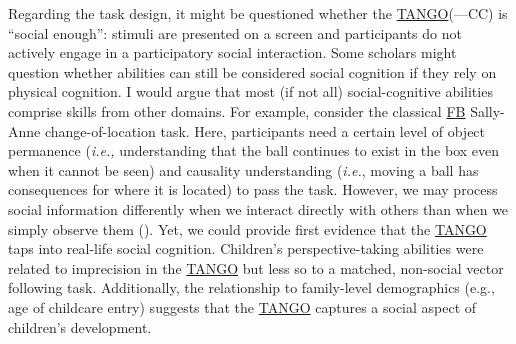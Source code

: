 \documentclass[
]{scrbook}
\begin{document}
Regarding the task design, it might be questioned whether the \hyperref[acronyms_TANGO]{TANGO}(---CC) is ``social enough'': stimuli are presented on a screen and participants do not actively engage in a participatory social interaction. Some scholars might question whether abilities can still be considered social cognition if they rely on physical cognition. I would argue that most (if not all) social-cognitive abilities comprise skills from other domains. For example, consider the classical \hyperref[acronyms_FB]{FB} Sally-Anne change-of-location task. Here, participants need a certain level of object permanence (\emph{i.e.,} understanding that the ball continues to exist in the box even when it cannot be seen) and causality understanding (\emph{i.e.}, moving a ball has consequences for where it is located) to pass the task. However, we may process social information differently when we interact directly with others than when we simply observe them (). Yet, we could provide first evidence that the \hyperref[acronyms_TANGO]{TANGO} taps into real-life social cognition. Children's perspective-taking abilities were related to imprecision in the \hyperref[acronyms_TANGO]{TANGO} but less so to a matched, non-social vector following task. Additionally, the relationship to family-level demographics (e.g., age of childcare entry) suggests that the \hyperref[acronyms_TANGO]{TANGO} captures a social aspect of children's development.
\end{document}
